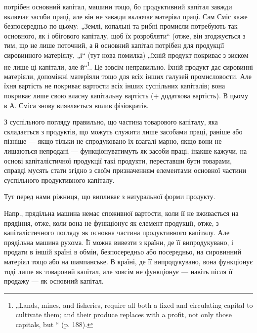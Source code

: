 \parcont{}  %
потрібен основний капітал, машини тощо, бо продуктивний капітал завжди
включає засоби праці, але він не завжди включає матеріял праці. Сам
Сміс каже безпосередньо по цьому: „Землі, копальні та рибні промисли
потребують так основного, як і обігового капіталу, щоб їх розробляти“
(отже, він згоджується з тим, що не лише поточний, а й основний капітал
потрібен для продукції сировинного матеріялу, „і“ (тут нова помилка)
„їхній продукт покриває з зиском не лише ці капітали, але й“\footnote*{
„Lands, mines, and fisheries, require all both a fixed and circulating capital
to cultivate them; and their produce replaces with a profit, not only those capitals,
but “ (p. 188).
}. Це зовсім неправильно. Їхній продукт
дає сировинні матеріяли, допоміжні матеріяли тощо для всіх інших галузей
промисловости. Але їхня вартість не покриває вартости всіх інших
суспільних капіталів; вона покриває лише свою власну капітальну вартість
(+ додаткова вартість). В цьому в А. Сміса знову виявляється
вплив фізіократів.

З суспільного погляду правильно, що частина товарового капіталу,
яка складається з продуктів, що можуть служити лише засобами праці,
раніше або пізніше — якщо тільки не спродуковано їх взагалі марно,
якщо вони не лишаються непродані — функціонуватимуть як засоби праці;
інакше кажучи, на основі капіталістичної продукції такі продукти,
переставши бути товарами, справді мусять стати згідно з своїм призначенням
елементами основної частини суспільного продуктивного капіталу.

Тут перед нами ріжниця, що випливає з натуральної форми продукту.

Напр., прядільна машина немає споживної вартости, коли її не вживається
на прядіння, отже, коли вона не функціонує як елемент продукції,
отже, з капіталістичного погляду як основна частина продуктивного
капіталу. Але прядільна машина рухома. Її можна вивезти з країни, де
її випродукувано, і продати в іншій країні в обмін, безпосередньо або
посередньо, на сировинний матеріял тощо або на шампанське. В країні,
де її випродукувано, вона функціонує тоді лише як товаровий капітал,
але зовсім не функціонує — навіть після її продажу — як основний капітал.

